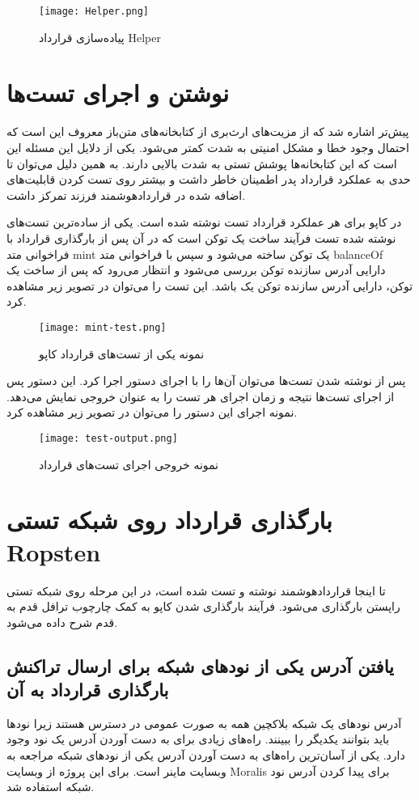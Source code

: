 \begin{figure}[ht]
\centerline{\texttt{[image: Helper.png]}}
\caption{پیاده‌سازی قرارداد Helper}
\label{fig:Helper}
\end{figure}

\section{نوشتن و اجرای تست‌ها}
پیش‌تر اشاره شد که از مزیت‌های ارث‌بری از کتابخانه‌های متن‌باز معروف این است که احتمال وجود خطا و مشکل امنیتی به شدت کمتر می‌شود. یکی از دلایل این مسئله این است که این کتابخانه‌ها پوشش تستی به شدت بالایی دارند. به همین دلیل می‌توان تا حدی به عملکرد قرارداد پدر اطمینان خاطر داشت و بیشتر روی تست کردن قابلیت‌های اضافه شده در قراردادهوشمند فرزند تمرکز داشت.

در کاپو برای هر عملکرد قرارداد تست نوشته شده است. یکی از ساده‌ترین تست‌های نوشته شده تست فرآیند ساخت یک توکن است که در آن پس از بارگذاری قرارداد با فراخوانی متد mint یک توکن ساخته می‌شود و سپس با فراخوانی متد balanceOf دارایی آدرس سازنده توکن بررسی می‌شود و انتظار می‌رود که پس از ساخت یک توکن، دارایی آدرس سازنده توکن یک باشد. این تست را می‌توان در تصویر زیر مشاهده کرد.

\begin{figure}[ht]
\centerline{\texttt{[image: mint-test.png]}}
\caption{نمونه یکی از تست‌های قرارداد کاپو}
\label{fig:mint-test}
\end{figure}

پس از نوشته شدن تست‌ها می‌توان آن‌ها را با اجرای دستور
اجرا کرد. این دستور پس از اجرای تست‌ها نتیجه و زمان اجرای هر تست را به عنوان خروجی نمایش می‌دهد. نمونه اجرای این دستور را می‌توان در تصویر زیر مشاهده کرد.

\begin{figure}[ht]
\centerline{\texttt{[image: test-output.png]}}
\caption{نمونه خروجی اجرای تست‌های قرارداد}
\label{fig:test-output}
\end{figure}

\section{بارگذاری قرارداد روی شبکه تستی \gls{Ropsten}}
تا اینجا قراردادهوشمند نوشته و تست شده است، در این مرحله روی شبکه تستی راپستن بارگذاری می‌شود. فرآیند بارگذاری شدن کاپو به کمک چارچوب ترافل قدم به قدم شرح داده می‌شود.

\subsection{یافتن آدرس یکی از نود‌های شبکه برای ارسال تراکنش بارگذاری قرارداد به آن}
آدرس نود‌های یک شبکه بلاکچین همه به صورت عمومی در دسترس هستند زیرا نودها باید بتوانند یکدیگر را ببینند. راه‌های زیادی برای به دست آوردن آدرس یک نود وجود دارد. یکی از آسان‌ترین راه‌های به دست آوردن آدرس یکی از نود‌های شبکه مراجعه به وبسایت ماینر است. برای این پروژه از وبسایت Moralis
برای پیدا کردن آدرس نود شبکه استفاده شد.

